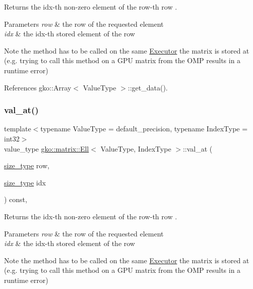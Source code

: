 Returns the {\ttfamily idx}-\/th non-\/zero element of the {\ttfamily row}-\/th row . 


\begin{DoxyParams}{Parameters}
{\em row} & the row of the requested element \\
\hline
{\em idx} & the idx-\/th stored element of the row\\
\hline
\end{DoxyParams}
\begin{DoxyNote}{Note}
the method has to be called on the same \hyperlink{classgko_1_1Executor}{Executor} the matrix is stored at (e.\+g. trying to call this method on a G\+PU matrix from the O\+MP results in a runtime error) 
\end{DoxyNote}


References gko\+::\+Array$<$ Value\+Type $>$\+::get\+\_\+data().

\mbox{\label{classgko_1_1matrix_1_1Ell_a3591fa0ab2ec09b43a15b0f0649d8ea3}} 
\subsubsection{\texorpdfstring{val\+\_\+at()}{val\_at()}\hspace{0.1cm}{\footnotesize\ttfamily [2/2]}}
{\footnotesize\ttfamily template$<$typename Value\+Type = default\+\_\+precision, typename Index\+Type = int32$>$ \\
value\+\_\+type \hyperlink{classgko_1_1matrix_1_1Ell}{gko\+::matrix\+::\+Ell}$<$ Value\+Type, Index\+Type $>$\+::val\+\_\+at (\begin{DoxyParamCaption}\item[{\hyperlink{namespacegko_a6e5c95df0ae4e47aab2f604a22d98ee7}{size\+\_\+type}}]{row,  }\item[{\hyperlink{namespacegko_a6e5c95df0ae4e47aab2f604a22d98ee7}{size\+\_\+type}}]{idx }\end{DoxyParamCaption}) const\hspace{0.3cm}{\ttfamily [inline]}, {\ttfamily [noexcept]}}



Returns the {\ttfamily idx}-\/th non-\/zero element of the {\ttfamily row}-\/th row . 


\begin{DoxyParams}{Parameters}
{\em row} & the row of the requested element \\
\hline
{\em idx} & the idx-\/th stored element of the row\\
\hline
\end{DoxyParams}
\begin{DoxyNote}{Note}
the method has to be called on the same \hyperlink{classgko_1_1Executor}{Executor} the matrix is stored at (e.\+g. trying to call this method on a G\+PU matrix from the O\+MP results in a runtime error) 
\end{DoxyNote}


